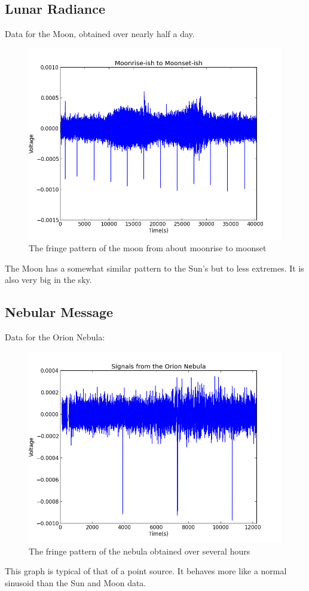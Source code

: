 \documentclass{article}
\begin{document}
\subsection{Lunar Radiance}
Data for the Moon, obtained over nearly half a day.
\begin{figure}[H]
\centering
\includegraphics[width=.9\textwidth]{moon.png}
\caption{The fringe pattern of the moon from about moonrise to moonset}
\end{figure}
The Moon has a somewhat similar pattern to the Sun's but to less
extremes. It is also very big in the sky.
\subsection{Nebular Message}
Data for the Orion Nebula:
\begin{figure}[H]
\centering
\includegraphics[width=.9\textwidth]{orion.png}
\caption{The fringe pattern of the nebula obtained over several hours}
\end{figure}
This graph is typical of that of a point source. It behaves more like a
normal sinusoid than the Sun and Moon data.
\end{document}

